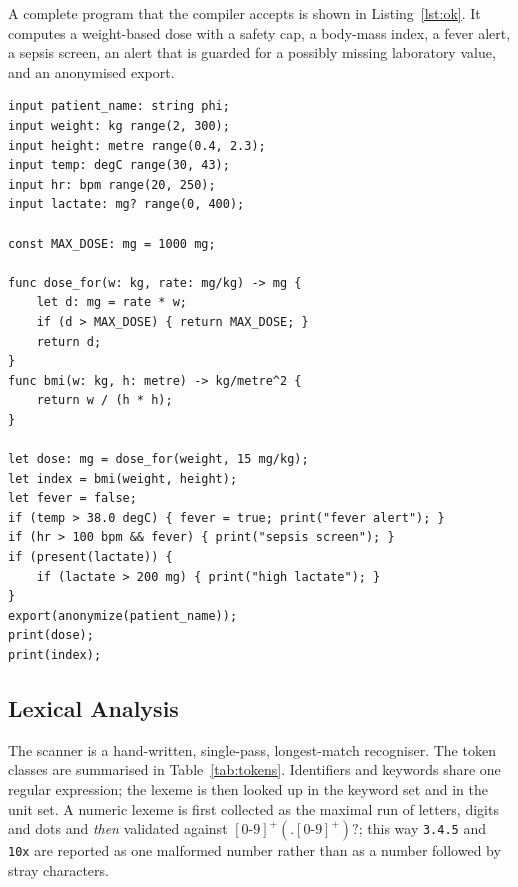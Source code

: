 \documentclass[conference]{IEEEtran}
\newcommand{\code}[1]{\texttt{#1}}
\begin{document}
A complete program that the compiler accepts is shown in Listing~\ref{lst:ok}. It computes a weight-based dose with
a safety cap, a body-mass index, a fever alert, a sepsis screen, an alert that is guarded for a possibly missing
laboratory value, and an anonymised export.

\begin{lstlisting}[language=MedScript,caption={A valid MedScript program (\texttt{examples/triage\_ok.med}).},label={lst:ok}]
input patient_name: string phi;
input weight: kg range(2, 300);
input height: metre range(0.4, 2.3);
input temp: degC range(30, 43);
input hr: bpm range(20, 250);
input lactate: mg? range(0, 400);

const MAX_DOSE: mg = 1000 mg;

func dose_for(w: kg, rate: mg/kg) -> mg {
    let d: mg = rate * w;
    if (d > MAX_DOSE) { return MAX_DOSE; }
    return d;
}
func bmi(w: kg, h: metre) -> kg/metre^2 {
    return w / (h * h);
}

let dose: mg = dose_for(weight, 15 mg/kg);
let index = bmi(weight, height);
let fever = false;
if (temp > 38.0 degC) { fever = true; print("fever alert"); }
if (hr > 100 bpm && fever) { print("sepsis screen"); }
if (present(lactate)) {
    if (lactate > 200 mg) { print("high lactate"); }
}
export(anonymize(patient_name));
print(dose);
print(index);
\end{lstlisting}

\subsection{Lexical Analysis}

The scanner is a hand-written, single-pass, longest-match recogniser. The token classes are summarised in
Table~\ref{tab:tokens}. Identifiers and keywords share one regular expression; the lexeme is then looked up in the
keyword set and in the unit set. A numeric lexeme is first collected as the maximal run of letters, digits and dots
and \emph{then} validated against $[0\text{-}9]^+(.[0\text{-}9]^+)?$; this way \code{3.4.5} and \code{10x} are reported as one
malformed number rather than as a number followed by stray characters.
\end{document}
